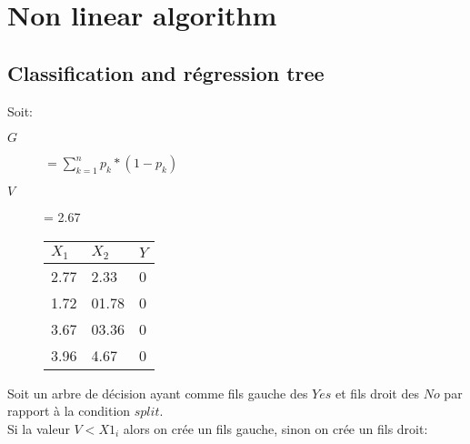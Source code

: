 \chapter{Non linear algorithm}\pagebreak
\section{Classification and régression tree}
Soit:\\
\begin{description}
\item[$G$] $ = \sum_{k=1}^n p_k * (1 - p_k)$
\item[$V$] = 2.67
\item[] \begin{tabular}{ll|l}
  \hline
  $ X_1 $ & $ X_2 $ &  $Y $\\
  \hline
  2.77 & 2.33 & 0\\
  1.72 & 01.78 & 0\\
  3.67 & 03.36 & 0\\
  3.96 & 4.67 & 0\\
  \hline
\end{tabular}
\end{description}

Soit un arbre de décision ayant comme fils gauche des $Yes$ et fils droit des $No$ par rapport à la condition $split$.\\
Si la valeur $V < X1_i$ alors on crée un fils gauche, sinon on crée un fils droit:\\

